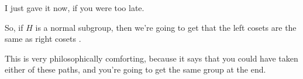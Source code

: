 \begin{speech}[00:06:41 - 00:07:03]
I just gave it now, if you were too late.

So, if $H$ is a normal subgroup, then we're going to get that the left cosets are the same as right cosets .

This is very philosophically comforting, because it says that you could have taken either of these paths, and you're going to get the same group at the end.
\end{speech}

\begin{content}
\end{content}

\begin{hidden}
\end{hidden}

